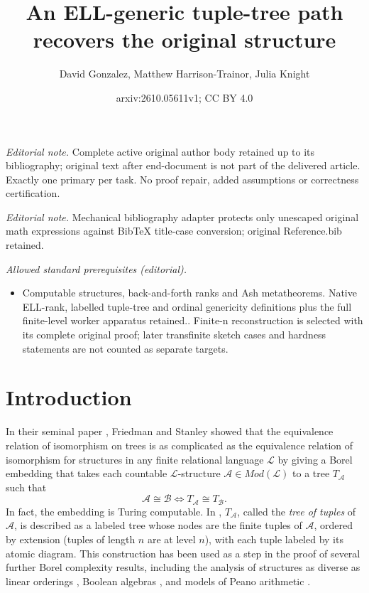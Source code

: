 \documentclass[10pt,a4paper]{article}
\title{An ELL-generic tuple-tree path recovers the original structure}
\author{David Gonzalez, Matthew Harrison-Trainor, Julia Knight}
\date{arxiv:2610.05611v1; CC BY 4.0}
\theoremstyle{definition}
\begin{document}
\maketitle
\noindent\textit{Editorial note.} Complete active original author body retained up to its bibliography; original text after end-document is not part of the delivered article. Exactly one primary per task. No proof repair, added assumptions or correctness certification.\par\medskip
\noindent\textit{Editorial note.} Mechanical bibliography adapter protects only unescaped original math expressions against BibTeX title-case conversion; original Reference.bib retained.\par\medskip
\noindent\textit{Allowed standard prerequisites (editorial).}\begin{itemize}
\item Computable structures, back-and-forth ranks and Ash metatheorems. Native ELL-rank, labelled tuple-tree and ordinal genericity definitions plus the full finite-level worker apparatus retained.. Finite-n reconstruction is selected with its complete original proof; later transfinite sketch cases and hardness statements are not counted as separate targets.
\end{itemize}\medskip
	\section{Introduction}
	
	In their seminal paper \cite{FriedmanStanley}, Friedman and Stanley showed that the equivalence relation of isomorphism on trees is as complicated as the equivalence relation of isomorphism for structures in any finite relational language $\mathcal{L}$ by giving a Borel embedding that takes each countable $\mathcal{L}$-structure $\mathcal{A} \in Mod(\mathcal{L})$ to a tree $T_{\mathcal{A}}$ such that
	\[ \mathcal{A} \cong \mathcal{B} \Longleftrightarrow T_{\mathcal{A}} \cong T_{\mathcal{B}}.\] In fact, the embedding is Turing computable. 
	In \cite{HTMontalban}, $T_{\mathcal{A}}$, called the \textit{tree of tuples} of $\mathcal{A}$, is described as a labeled tree whose nodes are the finite tuples of $\mathcal{A}$, ordered by extension (tuples of length $n$ are at level $n$), with each tuple labeled by its atomic diagram. This construction has been used as a step in the proof of several further Borel complexity results, including the analysis of structures as diverse as linear orderings \cite{FriedmanStanley}, Boolean algebras \cite{CamerloGao}, and models of Peano arithmetic \cite{MR,GLRS}. 
	
\end{document}
